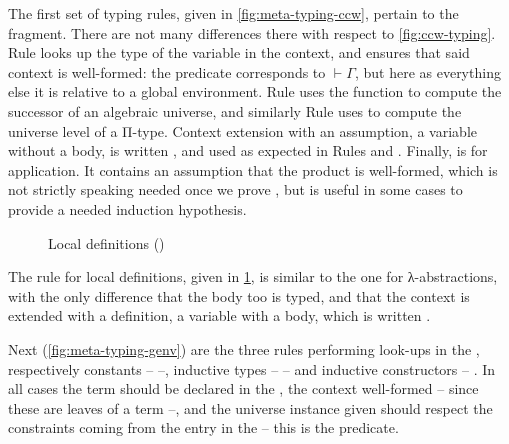 The first set of typing rules, given in \cref{fig:meta-typing-ccw},
pertain to the  fragment. There are not many differences
there with respect to \cref{fig:ccw-typing}. Rule  looks up the type of the
variable in the context, and ensures that said context is well-formed:
the  predicate corresponds to $\vdash \Gamma$, but here as everything else it is
relative to a global environment. Rule  uses the  function to compute
the successor of an algebraic universe, and similarly Rule  uses
 to compute the universe level of a Π-type.%
Context extension with an assumption, \ie a variable without a body,
is written , and used as expected in Rules 
and . Finally,  is for application. It contains an
assumption that the product is well-formed, which is not strictly speaking needed once we
prove , but is useful in some cases to provide a needed induction hypothesis.

\begin{figure}
  \ContinuedFloat
  \caption{Local definitions ()}
  \label{fig:meta-typing-letin}
\end{figure}

The rule for local definitions, given in \cref{fig:meta-typing-letin}, is similar to the one
for λ-abstractions, with the only difference that the body too is typed, and that the context
is extended with a definition, \ie a variable with a body, which is written .

\begin{figure*}
  \ContinuedFloat
  \caption{Globally defined terms ()}
  \label{fig:meta-typing-genv}
\end{figure*}

Next (\cref{fig:meta-typing-genv}) are the three rules performing look-ups in
the , respectively constants –  –, inductive types –
 – and inductive constructors – . In all cases the
term should be declared in the , the context well-formed
– since these are leaves of a term –,
and the universe instance given should respect the constraints coming from the
entry in the  – this is the  predicate.

